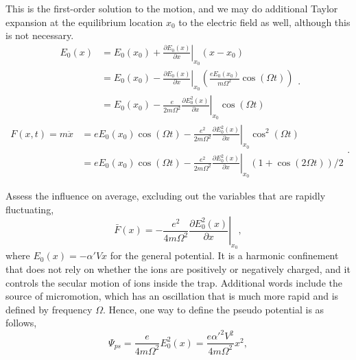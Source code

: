 This is the first-order solution to the motion, and we may do additional Taylor expansion at the equilibrium location $x_0$ to the electric field as well, although this is not necessary.
\begin{equation}
    \begin{aligned}
        E_0(x) & =E_0\left(x_0\right)+\left.\frac{\partial E_0(x)}{\partial x}\right|_{x_0}\left(x-x_0\right)                                                    \\
               & =E_0\left(x_0\right)-\left.\frac{\partial E_0(x)}{\partial x}\right|_{x_0}\left(\frac{e E_0\left(x_0\right)}{m \Omega^2} \cos (\Omega t)\right) \\
               & =E_0\left(x_0\right)-\left.\frac{e}{2 m \Omega^2} \frac{\partial E_0^2(x)}{\partial x}\right|_{x_0} \cos (\Omega t)
    \end{aligned}
    .
\end{equation}
\begin{equation}
    \begin{aligned}
        F(x, t)=m \ddot{x} & =e E_0\left(x_0\right) \cos (\Omega t)-\left.\frac{e^2}{2 m \Omega^2} \frac{\partial E_0^2(x)}{\partial x}\right|_{x_0} \cos ^2(\Omega t)        \\
                           & =e E_0\left(x_0\right) \cos (\Omega t)-\left.\frac{e^2}{2 m \Omega^2} \frac{\partial E_0^2(x)}{\partial x}\right|_{x_0}(1+\cos (2 \Omega t)) / 2
    \end{aligned}
    .
\end{equation}

Assess the influence on average, excluding out the variables that are rapidly fluctuating,
\begin{equation}
    \bar{F}(x)=-\left.\frac{e^2}{4 m \Omega^2} \frac{\partial E_0^2(x)}{\partial x}\right|_{x_0},
\end{equation}
where \(E_0(x)=-\alpha'V x\) for the general potential. It is a harmonic confinement that does not rely on whether the ions are positively or negatively charged, and it controls the secular motion of ions inside the trap. Additional words include the source of micromotion, which has an oscillation that is much more rapid and is defined by frequency \(\Omega\). Hence, one way to define the pseudo potential is as follows,
\begin{equation}\label{eq:pseudo_potential}
    \Psi_{ps}=\frac{e}{4m\Omega^2}E_0^2(x)=\frac{e\alpha'^2V^2}{4m\Omega^2}x^2,
\end{equation}

